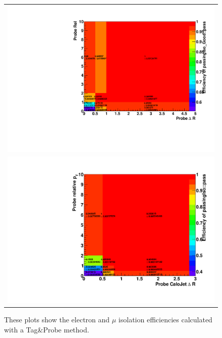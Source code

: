 \begin{figure}[tbhn]
\begin{center}
\begin{tabular}{c}
\includegraphics[width=.85\textwidth]{lostlepton/plots/Elec_Iso.pdf}\\
\includegraphics[width=.85\textwidth]{lostlepton/plots/Muon_Iso.pdf}\\
\end{tabular}
\end{center}
\caption{These plots show the electron and $\mu$ isolation efficiencies calculated with a Tag\&Probe method.
}
\label{fig:iso_eff}
\end{figure}


\clearpage



